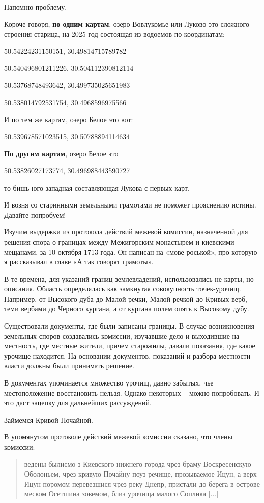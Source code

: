 Напомню проблему. 

Короче говоря, \textbf{по одним  картам}, озеро Вовлукомье или Луково это сложного строения старица, на 2025 год состоящая из водоемов по координатам:

50.54224231150151, 30.49814715789782

50.540496801211226, 30.504112390812114

50.53768748493642, 30.499735025651983

50.538014792531754, 30.4968596975566

И по тем же картам, озеро Белое это вот:

50.539678571023515, 30.50788894114634

\textbf{По другим картам}, озеро Белое это

50.53826027173774, 30.496988443590727

то бишь юго-западная составляющая Лукова с первых карт.

И возня со старинными земельными грамотами не поможет прояснению истины. Давайте попробуем!

Изучим выдержки из протокола действий межевой комиссии, назначенной для решения спора о границах между Межигорским монастырем и киевскими мещанами, за 10 октября 1713 года\cite{sbornikmat}. Он написан на «мове роськой», про которую я рассказывал в главе «А так говорят грамоты».

В те времена, для указаний границ землевладений, использовались не карты, но описания. Область определялась как замкнутая совокупность точек-урочищ. Например, от Высокого дуба до Малой речки, Малой речкой до Кривых верб, теми вербами до Черного кургана, а от кургана полем опять к Высокому дубу.

Существовали документы, где были записаны границы. В случае возникновения земельных споров создавались комиссии, изучавшие дело и выходившие на местность, где местные жители, причем старожилы, давали показания, где какое урочище находится. На основании документов, показаний и разбора местности власти должны были принимать решение.

В документах упоминается множество урочищ, давно забытых, чье местоположение восстановить нельзя. Однако некоторых – можно попробовать. И это даст зацепку для дальнейших рассуждений.

Займемся Кривой Почайной.

В упомянутом протоколе действий межевой комиссии сказано, что члены комиссии:

\begin{quotation}
ведены былисмо з Киевского нижнего города чрез браму Воскресенскую – Оболоньем, чрез кривую Почайну поуз речище, прозываемое Ицун, а верх Ицун поромом перевезшися чрез реку Днепр, пристали до берега в острове меском Осетшина зовемом, близ урочища малого Соплика [...]
\end{quotation}

